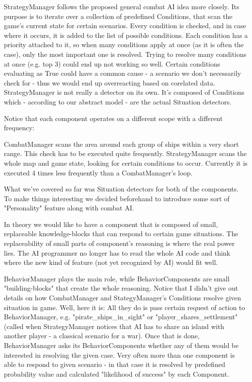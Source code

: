 StrategyManager follows the proposed general combat AI idea more closely. Its purpose is to iterate over a collection of predefined Conditions, that scan the game's current state for certain scenarios. 
Every condition is checked, and in case where it occurs, it is added to the list of possible conditions. 
Each condition has a priority attached to it, so when many conditions apply at once (as it is often the case), only the most important one is resolved. 
Trying to resolve many conditions at once (e.g. top 3) could end up not working so well. 
Certain conditions evaluating as True could have a common cause - a scenario we don't necessarily check for - thus we would end up overreacting based on corelated data. 
StrategyManager is not really a detector on its own. 
It's composed of Conditions which - according to our abstract model - are the actual Situation detectors.

Notice that each component operates on a different scope with a different frequency:

    CombatManager scans the area around each group of ships within a very short range. This check has to be executed quite frequently.
    StrategyManager scans the whole map and game state, looking for certain conditions to occur. 
	Currently it is executed 4 times less frequently than a CombatManager's loop.

What we've covered so far was Situation detectors for both of the components. 
To make things interesting we decided beforehand to introduce some sort of "Personality" feature along with combat AI.

In theory we would like to have a component that is composed of small, replaceable knowledge-blocks that can respond to certain game situations. 
The replaceability of small parts of component's reasoning is where the real power lies. 
The AI programmer no longer has to read the whole AI code and think where the new kind of feature (not yet recognized by AI) would fit well.

BehaviorManager plays the main role, while BehaviorComponents are small "building-blocks" that create the whole reasoning. 
Notice that I didn't give out details on how CombatManager and StategyManager's Conditions resolve given situation in game. 
Well, here it is: All they do is pass certain request of action to BehaviorManager, e.g. "pirate_ships_in_sight" or "player_shares_settlement" (called when StrategyManager notices that AI has to share an island with another player - a classical scenario for a war). 
Once that is done, BehaviorManager asks its BehaviorComponents whether any of them would be interested in resolving the given case. 
Very often more than one component is able to respond to given scenario - in that case it is resolved by predefined probability value and calculated "likelihood of success" by each Component.

